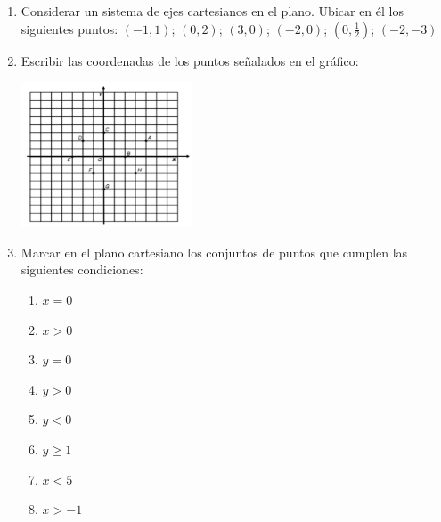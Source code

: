 \documentclass[12pt]{article}
\theoremstyle{definition}
\begin{document}
\begin{enumerate}
\vspace{0.2 cm}

\item Considerar un sistema de ejes cartesianos en el plano. Ubicar en él los siguientes puntos: $(-1,1)$;  $(0,2)$;  $(3,0)$;  $(-2,0)$; $(0,\frac{1}{2})$;  $(-2,-3)$

\item Escribir las coordenadas de los puntos señalados en el gráfico:
\begin{center} 
\includegraphics[width=0.4\textwidth]{tp2_fig3.jpg} 
\end{center}

\item Marcar en el plano cartesiano los conjuntos de puntos que cumplen las siguientes condiciones:
\begin{multicols}{4}
\begin{enumerate} [leftmargin=2cm]
\item $x = 0$ 
\item  $x > 0$
\item $y = 0$ 
\item  $y > 0$
\item  $y < 0$ 
\item $y \geq 1$
\item  $x < 5$
\item  $x > -1$
\end{enumerate}
\end{multicols}



\end{enumerate}
\end{document}
